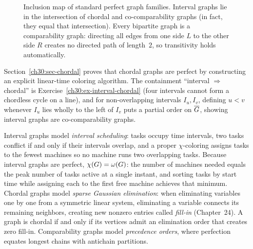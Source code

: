 \begin{figure}[htbp]
\caption{Inclusion map of standard perfect graph families. Interval graphs lie in the intersection of chordal and co-comparability graphs (in fact, they equal that intersection). Every bipartite graph is a comparability graph: directing all edges from one side $L$ to the other side $R$ creates no directed path of length~$2$, so transitivity holds automatically.}
\label{ch30:fig-hierarchy}
\end{figure}

Section~\ref{ch30:sec-chordal} proves that chordal graphs are perfect by constructing an explicit linear-time coloring algorithm. The containment ``interval $\Rightarrow$ chordal'' is Exercise~\ref{ch30:ex-interval-chordal} (four intervals cannot form a chordless cycle on a line), and for non-overlapping intervals $I_u,I_v$, defining $u<v$ whenever $I_u$ lies wholly to the left of $I_v$ puts a partial order on $\overline{G}$, showing interval graphs are co-comparability graphs.

\begin{applicationbox}
Interval graphs model \emph{interval scheduling}: tasks occupy time intervals, two tasks conflict if and only if their intervals overlap, and a proper $\chi$-coloring assigns tasks to the fewest machines so no machine runs two overlapping tasks. Because interval graphs are perfect, $\chi(G)=\omega(G)$: the number of machines needed equals the peak number of tasks active at a single instant, and sorting tasks by start time while assigning each to the first free machine achieves that minimum. Chordal graphs model \emph{sparse Gaussian elimination}: when eliminating variables one by one from a symmetric linear system, eliminating a variable connects its remaining neighbors, creating new nonzero entries called \emph{fill-in} (Chapter~24). A graph is chordal if and only if its vertices admit an elimination order that creates zero fill-in. Comparability graphs model \emph{precedence orders}, where perfection equates longest chains with antichain partitions.
\end{applicationbox}

